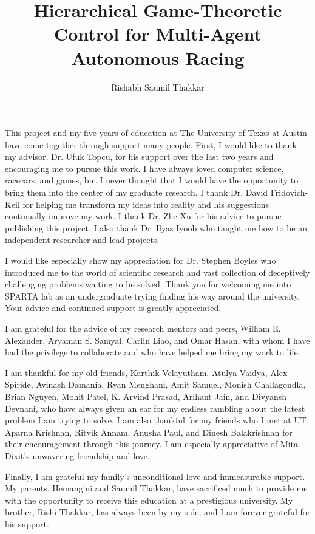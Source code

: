 \documentclass[12pt]{report}
\author{Rishabh Saumil Thakkar}  	%
\title{Hierarchical Game-Theoretic Control for Multi-Agent Autonomous Racing}
\theoremstyle{definition}
\theoremstyle{remark}
\numberwithin{equation}{section}
\begin{document}
\copyrightpage
\titlepage
\commcertpage
\begin{acknowledgments}	
This project and my five years of education at The University of Texas at Austin have come together through support many people. First, I would like to thank my advisor, Dr. Ufuk Topcu, for his support over the last two years and encouraging me to pursue this work. I have always loved computer science, racecars, and games, but I never thought that I would have the opportunity to bring them into the center of my graduate research. I thank Dr. David Fridovich-Keil for helping me transform my ideas into reality and his suggestions continually improve my work. I thank Dr. Zhe Xu for his advice to pursue publishing this project. I also thank Dr. Ilyas Iyoob who taught me how to be an independent researcher and lead projects.

I would like especially show my appreciation for Dr. Stephen Boyles who introduced me to the world of scientific research and vast collection of deceptively challenging problems waiting to be solved. Thank you for welcoming me into SPARTA lab as an undergraduate trying finding his way around the university. Your advice and continued support is greatly appreciated. 

I am grateful for the advice of my research mentors and peers, William E. Alexander, Aryaman S. Samyal, Carlin Liao, and Omar Hasan, with whom I have had the privilege to collaborate and who have helped me bring my work to life.

I am thankful for my old friends, Karthik Velayutham, Atulya Vaidya, Alex Spiride, Avinash Damania, Ryan Menghani, Amit Samuel, Monish Challagondla, Brian Nguyen, Mohit Patel, K. Arvind Prasad, Arihant Jain, and Divyansh Devnani, who have always given an ear for my endless rambling about the latest problem I am trying to solve. I am also thankful for my friends who I met at UT, Aparna Krishnan, Ritvik Annam, Anusha Paul, and Dinesh Balakrishnan for their encouragement through this journey. I am especially appreciative of Mita Dixit's unwavering friendship and love. 

Finally, I am grateful my family's unconditional love and immeasurable support. My parents, Hemangini and Saumil Thakkar, have sacrificed much to provide me with the opportunity to receive this education at a prestigious university. My brother, Rishi Thakkar, has always been by my side, and I am forever grateful for his support. 
\end{acknowledgments}
\end{document}
